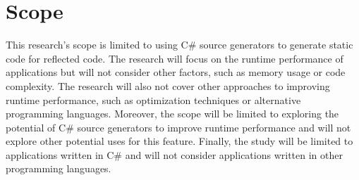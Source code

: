 \section{Scope}

This research's scope is limited to using C\# source generators to generate static code for reflected code. The research will focus on the runtime performance of applications but will not consider other factors, such as memory usage or code complexity. The research will also not cover other approaches to improving runtime performance, such as optimization techniques or alternative programming languages. Moreover, the scope will be limited to exploring the potential of C\# source generators to improve runtime performance and will not explore other potential uses for this feature. Finally, the study will be limited to applications written in C\# and will not consider applications written in other programming languages.
